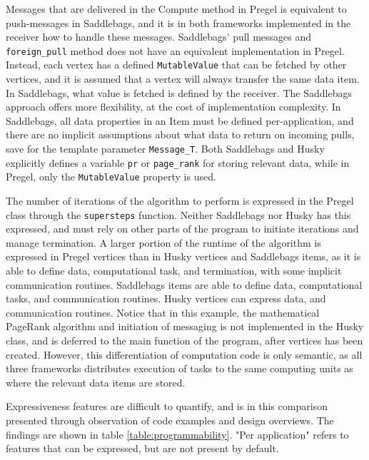 \documentclass{uit-report}
\begin{document}
Messages that are delivered in the Compute method in Pregel is equivalent to push-messages in Saddlebags, and it is in both frameworks implemented in the receiver how to handle these messages. Saddlebags' pull messages and \texttt{foreign\_pull} method does not have an equivalent implementation in Pregel. Instead, each vertex has a defined \texttt{MutableValue} that can be fetched by other vertices, and it is assumed that a vertex will always transfer the same data item. In Saddlebags, what value is fetched is defined by the receiver. The Saddlebags approach offers more flexibility, at the cost of implementation complexity. In Saddlebags, all data properties in an Item must be defined per-application, and there are no implicit assumptions about what data to return on incoming pulls, save for the template parameter \texttt{Message\_T}. Both Saddlebags and Husky explicitly defines a variable \texttt{pr} or \texttt{page\_rank} for storing relevant data, while in Pregel, only the \texttt{MutableValue} property is used.

The number of iterations of the algorithm to perform is expressed in the Pregel class through the \texttt{supersteps} function. Neither Saddlebags nor Husky has this expressed, and must rely on other parts of the program to initiate iterations and manage termination. A larger portion of the runtime of the algorithm is expressed in Pregel vertices than in Husky vertices and Saddlebags items, as it is able to define data, computational task, and termination, with some implicit communication routines. Saddlebags items are able to define data, computational tasks, and communication routines. Husky vertices can express data, and communication routines. Notice that in this example, the mathematical PageRank algorithm and initiation of messaging is not implemented in the Husky class, and is deferred to the main function of the program, after vertices has been created. However, this differentiation of computation code is only semantic, as all three frameworks distributes execution of tasks to the same computing units as where the relevant data items are stored.

Expressiveness features are difficult to quantify, and is in this comparison presented through observation of code examples and design overviews. The findings are shown in table \ref{table:programmability}. "Per application" refers to features that can be expressed, but are not present by default.
\end{document}
